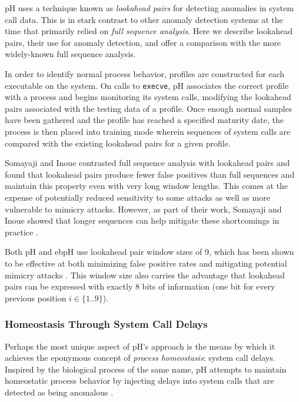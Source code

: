 \documentclass[
  12pt]{findlay}
\newcommand{\passthrough}[1]{#1}
\begin{document}
\label{ph-lap}

pH uses a technique known as \emph{lookahead pairs}
\autocite{soma02,soma07} for detecting anomalies in system call data.
This is in stark contrast to other anomaly detection systems at the time
that primarily relied on \emph{full sequence analysis}. Here we describe
lookahead pairs, their use for anomaly detection, and offer a comparison
with the more widely-known full sequence analysis.

In order to identify normal process behavior, profiles are constructed
for each executable on the system. On calls to
\passthrough{\lstinline!execve!}, pH associates the correct profile with
a process and begins monitoring its system calls, modifying the
lookahead pairs associated with the testing data of a profile. Once
enough normal samples have been gathered and the profile has reached a
specified maturity date, the process is then placed into training mode
wherein sequences of system calls are compared with the existing
lookahead pairs for a given profile.

Somayaji and Inoue \autocite{soma07} contrasted full sequence analysis
with lookahead pairs and found that lookahead pairs produce fewer false
positives than full sequences and maintain this property even with very
long window lengths. This comes at the expense of potentially reduced
sensitivity to some attacks as well as more vulnerable to mimicry
attacks. However, as part of their work, Somayaji and Inoue showed that
longer sequences can help mitigate these shortcomings in practice
\autocite{soma07}.

Both pH and ebpH use lookahead pair window sizes of 9, which has been
shown to be effective at both minimizing false positive rates and
mitigating potential mimicry attacks \autocite{soma02}. This window size
also carries the advantage that lookahead pairs can be expressed with
exactly 8 bits of information (one bit for every previous position
\(i \in \{1..9\}\)).

\hypertarget{homeostasis-through-system-call-delays}{%
\subsubsection{Homeostasis Through System Call
Delays}\label{homeostasis-through-system-call-delays}}

Perhaps the most unique aspect of pH's approach is the means by which it
achieves the eponymous concept of \emph{process homeostasis}: system
call delays. Inspired by the biological process of the same name, pH
attempts to maintain homeostatic process behavior by injecting delays
into system calls that are detected as being anomalous
\autocite{soma02}.
\end{document}
